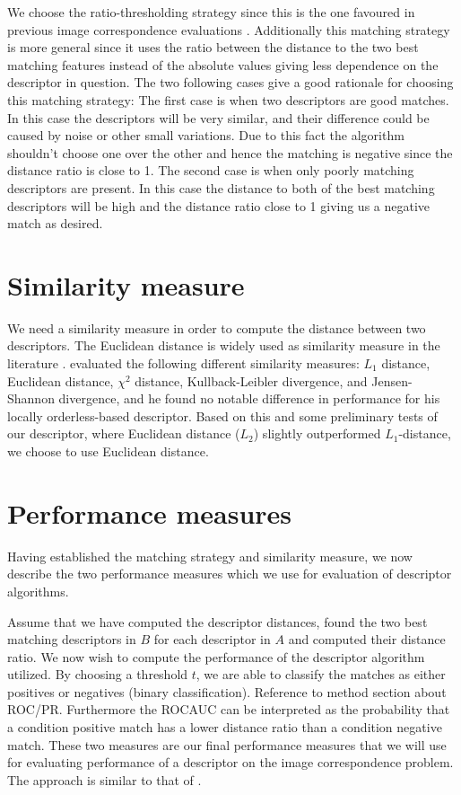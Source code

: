 \documentclass[thesis.tex]{subfiles}
\newcommand\ROC{ROC}
\begin{document}
We choose the ratio-thresholding strategy since this is the one favoured in previous image correspondence evaluations \cite{mikolajczyk2005performance,dahl2011finding,larsen2012jet,lowe2004distinctive}. Additionally this matching strategy is more general since it uses the ratio between the distance to the two best matching features instead of the absolute values giving less dependence on the descriptor in question. The two following cases give a good rationale for choosing this matching strategy: The first case is when two descriptors are good matches. In this case the descriptors will be very similar, and their difference could be caused by noise or other small variations. Due to this fact the algorithm shouldn't choose one over the other and hence the matching is negative since the distance ratio is close to 1. The second case is when only poorly matching descriptors are present. In this case the distance to both of the best matching descriptors will be high and the distance ratio close to 1 giving us a negative match as desired.


\section{Similarity measure}
\label{sec:similarity_measure}
We need a similarity measure in order to compute the distance between two descriptors. The Euclidean distance is widely used as similarity measure in the literature \cite{lowe2004distinctive,ke2004pca,mikolajczyk2005performance}. \citet{larsen2012in} evaluated the following different similarity measures: $L_1$ distance, Euclidean distance, $\chi^2$ distance, Kullback-Leibler divergence, and Jensen-Shannon divergence, and he found no notable difference in performance for his locally orderless-based descriptor. Based on this and some preliminary tests of our descriptor, where Euclidean distance ($L_2$) slightly outperformed $L_1$-distance, we choose to use Euclidean distance.

\section{Performance measures}
\label{sec:performance_measures}

Having established the matching strategy and similarity measure, we now describe the two performance measures which we use for evaluation of descriptor algorithms.

Assume that we have computed the descriptor distances, found the two best matching descriptors in $B$ for each descriptor in $A$ and computed their distance ratio. We now wish to compute the performance of the descriptor algorithm utilized. By choosing a threshold $t$, we are able to classify the matches as either positives or negatives (binary classification). Reference to method section about ROC/PR. Furthermore the \ROC AUC can be interpreted as the probability that a condition positive match has a lower distance ratio than a condition negative match. These two measures are our final performance measures that we will use for evaluating performance of a descriptor on the image correspondence problem. The approach is similar to that of \citet{winder2009picking,dahl2011finding}.
\end{document}
